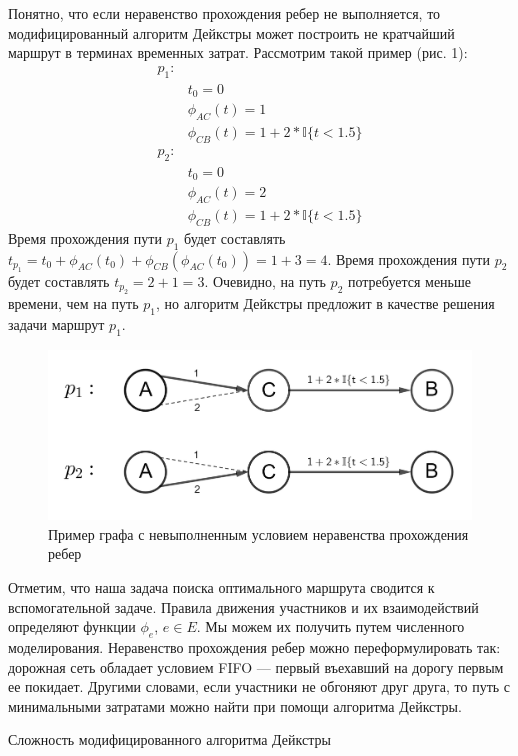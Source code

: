 \documentclass[12pt, a4paper]{article}
\begin{document}
Понятно, что если неравенство прохождения ребер не выполняется, то модифицированный алгоритм Дейкстры может построить не кратчайший маршрут в терминах временных затрат. Рассмотрим такой пример (рис. 1):
\begin{align*}
	p_1: & \\
	& t_0 = 0 \\
	& \phi_{AC}(t) = 1  \\
	& \phi_{CB}(t) = 1 + 2 * \mathbb{I} \{t < 1.5\} \\
	p_2: & \\
	& t_0 = 0 \\
	& \phi_{AC}(t) = 2  \\
	& \phi_{CB}(t) = 1 + 2 * \mathbb{I} \{t < 1.5\} 
\end{align*}
Время прохождения пути $p_1$ будет составлять $t_{p_1} = t_0 + \phi_{AC}(t_0) + \phi_{CB}(\phi_{AC}(t_0)) = 1 + 3 = 4 $. Время прохождения пути $p_2$ будет составлять $t_{p_2} = 2 + 1 = 3 $. Очевидно, на путь $p_2$ потребуется меньше времени, чем на путь $p_1$, но алгоритм Дейкстры предложит в качестве решения задачи маршрут $p_1$.

\begin{figure}[!hbp]
	\centering
		\includegraphics[scale=0.2]{graph_2.png}
	\caption{Пример графа с невыполненным условием неравенства прохождения ребер}
\end{figure}

Отметим, что наша задача поиска оптимального маршрута сводится к вспомогательной задаче. Правила движения участников и их взаимодействий определяют функции $\phi_e$, $e \in E $. Мы можем их получить путем численного моделирования. Неравенство прохождения ребер можно переформулировать так: дорожная сеть обладает условием FIFO --- первый въехавший на дорогу первым ее покидает. Другими словами, если участники не обгоняют друг друга, то путь с минимальными затратами можно найти при помощи алгоритма Дейкстры.


$\textbf{Сложность модифицированного алгоритма Дейкстры}$
\end{document}

